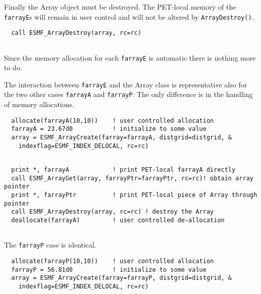 
   Finally the Array object must be destroyed. The PET-local memory of the
   {\tt farrayE}s will remain in user control and will not be altered by 
   {\tt ArrayDestroy()}. 

 \begin{verbatim}
  call ESMF_ArrayDestroy(array, rc=rc)
 
\end{verbatim}
 

   Since the memory allocation for each {\tt farrayE} is automatic there is
   nothing more to do.
  
   The interaction between {\tt farrayE} and the Array class is representative
   also for the two other cases {\tt farrayA} and {\tt farrayP}. The only
   difference is in the handling of memory allocations. 

 \begin{verbatim}
  allocate(farrayA(10,10))    ! user controlled allocation
  farrayA = 23.67d0           ! initialize to some value
  array = ESMF_ArrayCreate(farray=farrayA, distgrid=distgrid, &
    indexflag=ESMF_INDEX_DELOCAL, rc=rc)
 
\end{verbatim}
 

 \begin{verbatim}
  print *, farrayA            ! print PET-local farrayA directly
  call ESMF_ArrayGet(array, farrayPtr=farrayPtr, rc=rc)! obtain array pointer
  print *, farrayPtr          ! print PET-local piece of Array through pointer
  call ESMF_ArrayDestroy(array, rc=rc) ! destroy the Array
  deallocate(farrayA)         ! user controlled de-allocation
 
\end{verbatim}
 

   The {\tt farrayP} case is identical. 

 \begin{verbatim}
  allocate(farrayP(10,10))    ! user controlled allocation
  farrayP = 56.81d0           ! initialize to some value
  array = ESMF_ArrayCreate(farray=farrayP, distgrid=distgrid, &
    indexflag=ESMF_INDEX_DELOCAL, rc=rc)
 
\end{verbatim}
 

